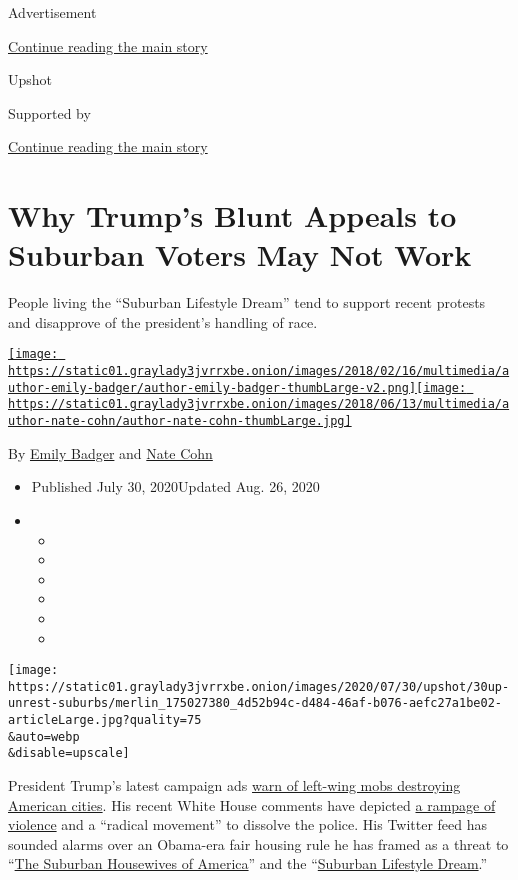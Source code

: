 Advertisement

\protect\hyperlink{after-top}{Continue reading the main story}

Upshot

Supported by

\protect\hyperlink{after-sponsor}{Continue reading the main story}

\hypertarget{why-trumps-blunt-appeals-to-suburban-voters-may-not-work}{%
\section{Why Trump's Blunt Appeals to Suburban Voters May Not
Work}\label{why-trumps-blunt-appeals-to-suburban-voters-may-not-work}}

People living the ``Suburban Lifestyle Dream'' tend to support recent
protests and disapprove of the president's handling of race.

\href{https://www.nytimes3xbfgragh.onion/by/emily-badger}{\texttt{[image: https://static01.graylady3jvrrxbe.onion/images/2018/02/16/multimedia/author-emily-badger/author-emily-badger-thumbLarge-v2.png]}}\href{https://www.nytimes3xbfgragh.onion/by/nate-cohn}{\texttt{[image: https://static01.graylady3jvrrxbe.onion/images/2018/06/13/multimedia/author-nate-cohn/author-nate-cohn-thumbLarge.jpg]}}

By \href{https://www.nytimes3xbfgragh.onion/by/emily-badger}{Emily
Badger} and \href{https://www.nytimes3xbfgragh.onion/by/nate-cohn}{Nate
Cohn}

\begin{itemize}
\item
  Published July 30, 2020Updated Aug. 26, 2020
\item
  \begin{itemize}
  \item
  \item
  \item
  \item
  \item
  \item
  \end{itemize}
\end{itemize}

\texttt{[image: https://static01.graylady3jvrrxbe.onion/images/2020/07/30/upshot/30up-unrest-suburbs/merlin\_175027380\_4d52b94c-d484-46af-b076-aefc27a1be02-articleLarge.jpg?quality=75\\\&auto=webp\\\&disable=upscale]}

President Trump's latest campaign ads
\href{https://www.nytimes3xbfgragh.onion/2020/07/21/us/politics/trump-campaign-ads.html}{warn
of left-wing mobs destroying American cities}. His recent White House
comments have depicted
\href{https://www.whitehouse.gov/briefings-statements/remarks-president-trump-operation-legend-combatting-violent-crime-american-cities/}{a
rampage of violence} and a ``radical movement'' to dissolve the police.
His Twitter feed has sounded alarms over an Obama-era fair housing rule
he has framed as a threat to
``\href{https://twitter.com/realDonaldTrump/status/1286372175117791236}{The
Suburban Housewives of America}'' and the
``\href{https://twitter.com/realDonaldTrump/status/1288509568578777088?s=20}{Suburban
Lifestyle Dream}.''


